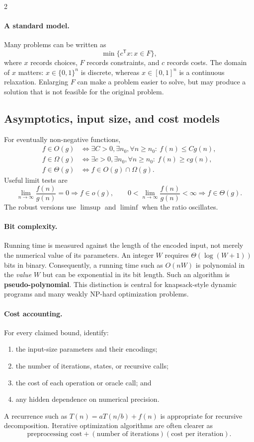 \documentclass[8pt]{extarticle}
\theoremstyle{definition}
\begin{document}
\begin{multicols*}{2}
\paragraph{A standard model.}
Many problems can be written as
\[
  \min\{c^{\mathsf T}x:x\in F\},
\]
where $x$ records choices, $F$ records constraints, and $c$ records costs.
The domain of $x$ matters: $x\in\{0,1\}^n$ is discrete, whereas
$x\in[0,1]^n$ is a continuous relaxation.  Enlarging $F$ can make a problem
easier to solve, but may produce a solution that is not feasible for the
original problem.

\subsection{Asymptotics, input size, and cost models}

For eventually non-negative functions,
\begin{align*}
f\in O(g)
&\iff \exists C>0,\exists n_0,\forall n\ge n_0:\ f(n)\le Cg(n),\\
f\in \Omega(g)
&\iff \exists c>0,\exists n_0,\forall n\ge n_0:\ f(n)\ge cg(n),\\
f\in \Theta(g)
&\iff f\in O(g)\cap\Omega(g).
\end{align*}
Useful limit tests are
\[
\lim_{n\to\infty}\frac{f(n)}{g(n)}=0\Rightarrow f\in o(g),\qquad
0<\lim_{n\to\infty}\frac{f(n)}{g(n)}<\infty\Rightarrow f\in\Theta(g).
\]
The robust versions use $\limsup$ and $\liminf$ when the ratio oscillates.

\paragraph{Bit complexity.}
Running time is measured against the length of the encoded input, not merely
the numerical value of its parameters.  An integer $W$ requires
$\Theta(\log(W+1))$ bits in binary.  Consequently, a running time such as
$O(nW)$ is polynomial in the \emph{value} $W$ but can be exponential in its
bit length.  Such an algorithm is \textbf{pseudo-polynomial}.  This distinction
is central for knapsack-style dynamic programs and many weakly NP-hard
optimization problems.

\paragraph{Cost accounting.}
For every claimed bound, identify:
\begin{enumerate}
  \item the input-size parameters and their encodings;
  \item the number of iterations, states, or recursive calls;
  \item the cost of each operation or oracle call; and
  \item any hidden dependence on numerical precision.
\end{enumerate}
A recurrence such as $T(n)=aT(n/b)+f(n)$ is appropriate for recursive
decomposition.  Iterative optimization algorithms are often clearer as
\[
  \text{preprocessing cost}
  + (\text{number of iterations})(\text{cost per iteration}).
\]


\end{multicols*}
\end{document}
